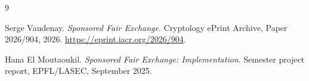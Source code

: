 \documentclass[11pt,a4paper,twoside,openright]{book}
\begin{document}
\frontmatter


\tableofcontents

\mainmatter













\appendix







\backmatter
\begin{thebibliography}{9}

Serge Vaudenay.
\newblock \emph{Sponsored Fair Exchange}.
\newblock Cryptology ePrint Archive, Paper 2026/904, 2026.
\newblock \url{https://eprint.iacr.org/2026/904}.

Hana El Moutaoukil.
\newblock \emph{Sponsored Fair Exchange: Implementation}.
\newblock Semester project report, EPFL/LASEC, September 2025.

\end{thebibliography}
\end{document}
